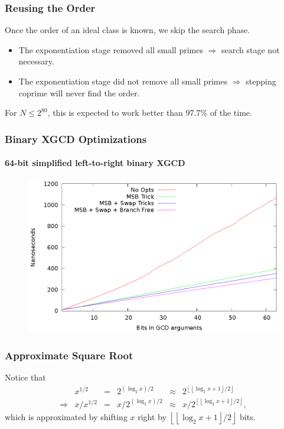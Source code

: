 \documentclass{beamer}
\newcommand{\floor}[1]{\left\lfloor #1 \right\rfloor}
\begin{document}
\begin{frame}
\frametitle{Reusing the Order}

Once the order of an ideal class is known, we skip the search phase.

\begin{itemize}
\item The exponentiation stage removed all small primes $\Rightarrow$ search stage not necessary.

\item The exponentiation stage did not remove all small primes $\Rightarrow$ stepping coprime will never find the order.
\end{itemize}

For $N \le 2^{80}$, this is expected to work better than 97.7\% of the time.

\end{frame}


\begin{frame}
\frametitle{Binary XGCD Optimizations}
\framesubtitle{64-bit simplified left-to-right binary XGCD}
\begin{figure}
\includegraphics[scale=0.86]{binary-xgcd-optimizations-64}
\end{figure}
\end{frame}



\begin{frame}
\frametitle{Approximate Square Root}
Notice that
\begin{equation*}
\begin{array}{rrlrlr}
	& x^{1/2} &=& 2^{(\log_2x)/2} &\approx& 2^{\floor{\floor{\log_2x+1}/2}} \\
	\Rightarrow & x / x^{1/2} &=& x / 2^{(\log_2x)/2} &\approx& x / 2^{\floor{\floor{\log_2x+1}/2}},
\end{array}
\end{equation*}
which is approximated by shifting $x$ right by $\floor{\floor{\log_2x+1}/2}$ bits.
\end{frame}
\end{document}
